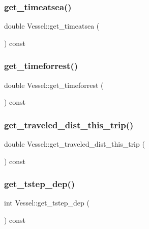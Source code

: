 \mbox{\label{class_vessel_ad428d1a780f020a09429922d98d19a10}} 
\subsubsection{\texorpdfstring{get\_timeatsea()}{get\_timeatsea()}}
{\footnotesize\ttfamily double Vessel\+::get\+\_\+timeatsea (\begin{DoxyParamCaption}{ }\end{DoxyParamCaption}) const}

\mbox{\label{class_vessel_afda93a057b0515a58c908d8eaebd7a0c}} 
\subsubsection{\texorpdfstring{get\_timeforrest()}{get\_timeforrest()}}
{\footnotesize\ttfamily double Vessel\+::get\+\_\+timeforrest (\begin{DoxyParamCaption}{ }\end{DoxyParamCaption}) const}

\mbox{\label{class_vessel_a626754fafadbc4960efc582bb621522b}} 
\subsubsection{\texorpdfstring{get\_traveled\_dist\_this\_trip()}{get\_traveled\_dist\_this\_trip()}}
{\footnotesize\ttfamily double Vessel\+::get\+\_\+traveled\+\_\+dist\+\_\+this\+\_\+trip (\begin{DoxyParamCaption}{ }\end{DoxyParamCaption}) const}

\mbox{\label{class_vessel_a0c262c624e2b5adbff070880a44c8a5e}} 
\subsubsection{\texorpdfstring{get\_tstep\_dep()}{get\_tstep\_dep()}}
{\footnotesize\ttfamily int Vessel\+::get\+\_\+tstep\+\_\+dep (\begin{DoxyParamCaption}{ }\end{DoxyParamCaption}) const}

